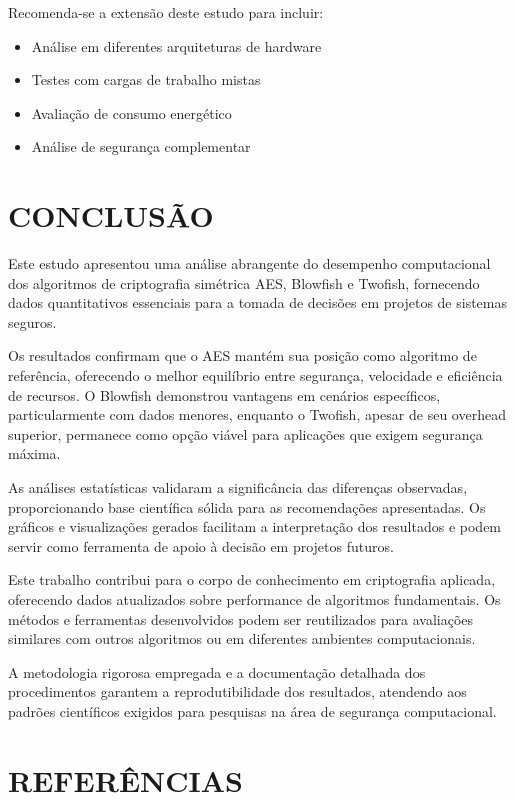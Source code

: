 \documentclass[12pt,a4paper,oneside]{article}
\begin{document}
Recomenda-se a extensão deste estudo para incluir:

\begin{itemize}
    \item Análise em diferentes arquiteturas de hardware
    \item Testes com cargas de trabalho mistas
    \item Avaliação de consumo energético
    \item Análise de segurança complementar
\end{itemize}

\section{CONCLUSÃO}

Este estudo apresentou uma análise abrangente do desempenho computacional dos algoritmos de criptografia simétrica AES, Blowfish e Twofish, fornecendo dados quantitativos essenciais para a tomada de decisões em projetos de sistemas seguros.

Os resultados confirmam que o AES mantém sua posição como algoritmo de referência, oferecendo o melhor equilíbrio entre segurança, velocidade e eficiência de recursos. O Blowfish demonstrou vantagens em cenários específicos, particularmente com dados menores, enquanto o Twofish, apesar de seu overhead superior, permanece como opção viável para aplicações que exigem segurança máxima.

As análises estatísticas validaram a significância das diferenças observadas, proporcionando base científica sólida para as recomendações apresentadas. Os gráficos e visualizações gerados facilitam a interpretação dos resultados e podem servir como ferramenta de apoio à decisão em projetos futuros.

Este trabalho contribui para o corpo de conhecimento em criptografia aplicada, oferecendo dados atualizados sobre performance de algoritmos fundamentais. Os métodos e ferramentas desenvolvidos podem ser reutilizados para avaliações similares com outros algoritmos ou em diferentes ambientes computacionais.

A metodologia rigorosa empregada e a documentação detalhada dos procedimentos garantem a reprodutibilidade dos resultados, atendendo aos padrões científicos exigidos para pesquisas na área de segurança computacional.

\section{REFERÊNCIAS}
\end{document}
